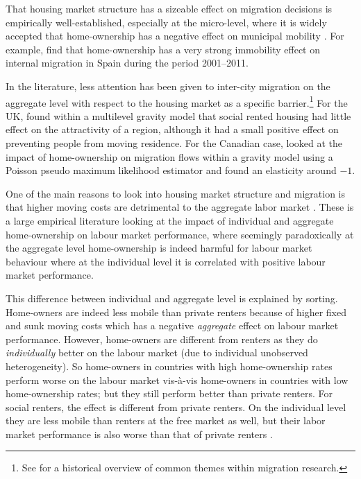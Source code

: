 \documentclass[fleqn,10pt]{SelfArx} %
\begin{document}
    	That housing market structure has a sizeable effect on migration
    	decisions is empirically well-established, especially at the
    	micro-level, where it is widely accepted that home-ownership has a
    	negative effect on municipal mobility \citep{dietz2003social,
    		dohmen2005housing}. For example, \citet{palomares2018understanding}
    	find that home-ownership has a very strong immobility effect on internal
    	migration in Spain during the period 2001--2011.
    	
    	In the literature, less attention has been given to inter-city
    	migration on the aggregate level with respect to the housing market as a
    	specific barrier.\footnote{See \citet{cushing2004crossing} for a
    		historical overview of common themes within migration research.} For
    	the UK, \citet{congdon2010random} found within a multilevel gravity
    	model that social rented housing had little effect on the attractivity
    	of a region, although it had a small positive effect on preventing
    	people from moving residence. For the Canadian case,
    	\citet{amirault2016drags} looked at the impact of home-ownership on
    	migration flows within a gravity model using a Poisson pseudo maximum
    	likelihood estimator and found an elasticity around $-1$.
    	           
        One of the main reasons to look into housing market structure and migration is that   
        higher moving costs are detrimental to the aggregate labor market
        \citep{oswald1996conjecture, oswald1999housing}. These is a large
        empirical literature \citep[see, e.g., ][]{munch2006homeowners,
          munch2008home, de2013european} looking at the impact of individual and
        aggregate home-ownership on labour market performance, where seemingly
        paradoxically at the aggregate level home-ownership is indeed harmful
        for labour market behaviour where at the individual level it is
        correlated with positive labour market performance.
        
        This difference between individual and aggregate level is explained by
        sorting. Home-owners are indeed less mobile than private renters because
        of higher fixed and sunk moving costs which has a negative
        \emph{aggregate} effect on labour market performance. However,
        home-owners are different from renters as they do \emph{individually}
        better on the labour market (due to individual unobserved
        heterogeneity). So home-owners in countries with high home-ownership
        rates perform worse on the labour market vis-\`a-vis home-owners in
        countries with low home-ownership rates; but they still perform better
        than private renters. For social renters, the effect is different from
        private renters. On the individual level they are less mobile than
        renters at the free market as well, but their labor market performance
        is also worse than that of private renters \citep{hughes1981council,
          de2009homeownership}.
        
\end{document}
